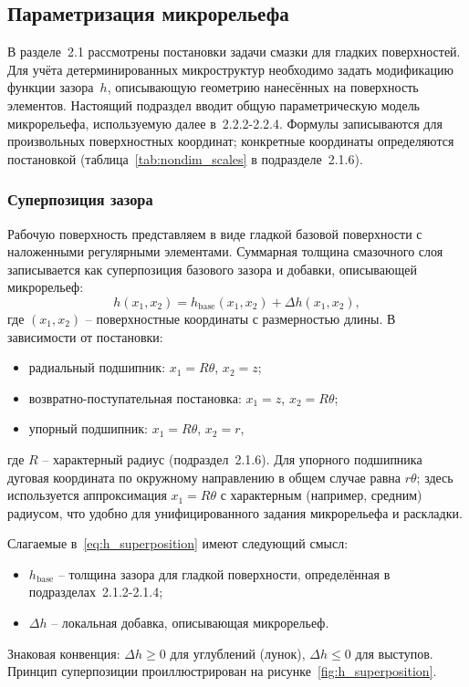 \subsection{Параметризация микрорельефа}

В разделе~2.1 рассмотрены постановки задачи смазки для гладких
поверхностей. Для учёта детерминированных микроструктур необходимо
задать модификацию функции зазора~$h$, описывающую геометрию
нанесённых на поверхность элементов. Настоящий подраздел вводит общую
параметрическую модель микрорельефа, используемую далее
в~2.2.2-2.2.4. Формулы записываются для произвольных поверхностных
координат; конкретные координаты определяются постановкой
(таблица~\ref{tab:nondim_scales} в подразделе~2.1.6).


\subsubsection*{Суперпозиция зазора}

Рабочую поверхность представляем в виде гладкой базовой поверхности
с наложенными регулярными элементами. Суммарная толщина смазочного
слоя записывается как суперпозиция базового зазора и добавки,
описывающей микрорельеф:
\begin{equation}
  h(x_1, x_2)
    = h_{\mathrm{base}}(x_1, x_2) + \Delta h(x_1, x_2),
  \label{eq:h_superposition}
\end{equation}
где $(x_1, x_2)$ -- поверхностные координаты с размерностью длины.
В зависимости от постановки:
\begin{itemize}
  \item радиальный подшипник: $x_1 = R\theta$, $x_2 = z$;
  \item возвратно-поступательная постановка: $x_1 = z$,
        $x_2 = R\theta$;
  \item упорный подшипник: $x_1 = R\theta$, $x_2 = r$,
\end{itemize}
где $R$ -- характерный радиус (подраздел~2.1.6). Для упорного
подшипника дуговая координата по окружному направлению в общем случае
равна $r\theta$; здесь используется аппроксимация $x_1 = R\theta$
с характерным (например, средним) радиусом, что удобно для
унифицированного задания микрорельефа и раскладки.

Слагаемые в~\eqref{eq:h_superposition} имеют следующий смысл:
\begin{itemize}
  \item $h_{\mathrm{base}}$ -- толщина зазора для гладкой поверхности,
        определённая в подразделах~2.1.2-2.1.4;
  \item $\Delta h$ -- локальная добавка, описывающая микрорельеф.
\end{itemize}
Знаковая конвенция: $\Delta h \geq 0$ для углублений (лунок),
$\Delta h \leq 0$ для выступов. Принцип суперпозиции проиллюстрирован
на рисунке~\ref{fig:h_superposition}.

